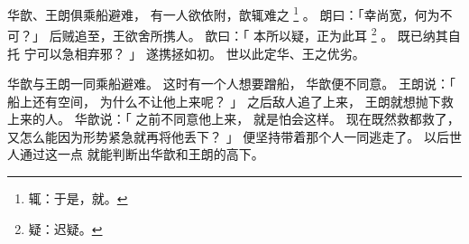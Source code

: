 
\switchcolumn*[\section{}]

华歆、王朗俱乘船避难，
有一人欲依附，歆辄难之%
\footnote{%
    辄：于是，就。
}%
。
朗曰：「幸尚宽，何为不可？」
后贼追至，王欲舍所携人。
歆曰：「
    本所以疑，正为此耳%
    \footnote{%
        疑：迟疑。
    }%
    。
    既已纳其自托
    宁可以急相弃邪？
」
遂携拯如初。
世以此定华、王之优劣。

\switchcolumn

华歆与王朗一同乘船避难。
这时有一个人想要蹭船，
华歆便不同意。
王朗说：「
    船上还有空间，
    为什么不让他上来呢？
」
之后敌人追了上来，
王朗就想抛下救上来的人。
华歆说：「
    之前不同意他上来，
    就是怕会这样。
    现在既然救都救了，
    又怎么能因为形势紧急就再将他丢下？
」
便坚持带着那个人一同逃走了。
以后世人通过这一点
就能判断出华歆和王朗的高下。

